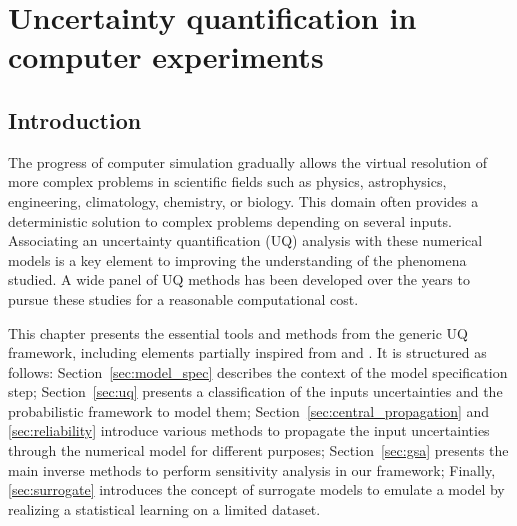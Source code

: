 \cleardoublepage
\chapter{Uncertainty quantification in computer experiments}
\label{chpt:1}
\vspace{-5pt}
\localtableofcontents
\newpage

\section{Introduction}\label{sec:intro}

The progress of computer simulation gradually allows the virtual resolution of more complex problems in scientific fields such as physics, astrophysics, engineering, climatology, chemistry, or biology. 
This domain often provides a deterministic solution to complex problems depending on several inputs. 
Associating an uncertainty quantification (UQ) analysis with these numerical models is a key element to improving the understanding of the phenomena studied. 
A wide panel of UQ methods has been developed over the years to pursue these studies for a reasonable computational cost. 

This chapter presents the essential tools and methods from the generic UQ framework, including elements partially inspired from \citet{sullivan_2015} and \citet{chabridon_2018_thesis}. 
It is structured as follows: Section~\ref{sec:model_spec} describes the context of the model specification step; 
Section~\ref{sec:uq} presents a classification of the inputs uncertainties and the probabilistic framework to model them; 
Section~\ref{sec:central_propagation} and \ref{sec:reliability} introduce various methods to propagate the input uncertainties through the numerical model for different purposes; 
Section~\ref{sec:gsa} presents the main inverse methods to perform sensitivity analysis in our framework; 
Finally, \ref{sec:surrogate} introduces the concept of surrogate models to emulate a model by realizing a statistical learning on a limited dataset.


